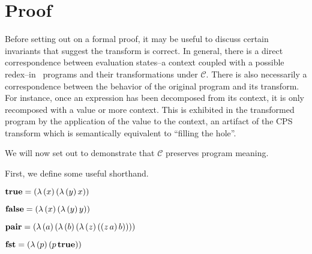 \chapter{Proof}



Before setting out on a formal proof, it may be useful to discuss certain invariants that
suggest the transform is correct. In general, there is a direct correspondence between
evaluation states--a context coupled with a possible redex--in \cm\ programs and their
transformations under $\mathcal{C}$. There is also necessarily a correspondence between
the behavior of the original program and its transform. For instance, once an expression
has been decomposed from its context, it is only recomposed with a value or more context.
This is exhibited in the transformed program by the application of the value to the
context, an artifact of the CPS transform which is semantically equivalent to ``filling
the hole''.

We will now set out to demonstrate that $\mathcal{C}$ preserves program meaning.

First, we define some useful shorthand.





\begin{defn}
$\mathbf{true}=(\lambda\,(x)\,(\lambda\,(y)\,x))$
\end{defn}

\begin{defn}
$\mathbf{false}=(\lambda\,(x)\,(\lambda\,(y)\,y))$
\end{defn}

\begin{defn}
$\mathbf{pair}=(\lambda\,(a)\,(\lambda\,(b)\,(\lambda\,(z)\,((z\,a)\,b))))$
\end{defn}

\begin{defn}
$\mathbf{fst}=(\lambda\,(p)\,(p\,\mathbf{true}))$
\end{defn}

